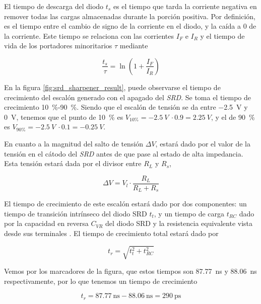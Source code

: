 El tiempo de descarga del diodo $t_s$ es el tiempo que tarda la corriente
negativa en remover todas las cargas almacenadas durante la porción positiva.
Por definición, es el tiempo entre el cambio de signo de la corriente en el
diodo, y la caída a $0$ de la corriente. Este tiempo se relaciona con las
corrientes $I_F$ e $I_R$ y el tiempo de vida de los portadores minoritarios
$\tau$ mediante \cite{an918}

\begin{equation}
    \frac{t_s}{\tau} = \ln \left( 1 + \frac{I_F}{I_R} \right)
\end{equation}

En la figura \ref{fig:srd_sharpener_result}, puede observarse el
tiempo de crecimiento del escalón generado con el apagado del \textit{SRD}. Se
toma el tiempo de crecimiento \qty{10}{\percent}-\qty{90}{\percent}. Siendo que
el escalón de tensión se da entre \qty{-2.5}{\volt} y \qty{0}{\volt}, tenemos
que el punto de \qty{10}{\percent} es $V_{10\%} = -2.5 \ V \ \cdot 0.9 =  2.25 \
V$, y el de \qty{90}{\percent} es $V_{90\%} = -2.5 \ V \ \cdot 0.1 =  -0.25 \
V$.

En cuanto a la magnitud del salto de tensión $\Delta V$, estará dado por el
valor de la tensión en el cátodo del \textit{SRD} antes de que pase al estado de
alta impedancia. Esta tensión estará dada por el divisor entre $R_L$ y $R_s$,

\begin{equation}
    \Delta V = V_l \cdot \frac{R_L}{R_L+R_s}
\end{equation}

El tiempo de crecimiento de este escalón estará dado por dos componentes: un
tiempo de transición intrínseco del diodo SRD $t_t$, y un tiempo de carga $t_{RC}$  dado por la
capacidad en reversa $C_{VR}$ del diodo SRD y la resistencia equivalente vista desde sus terminales \cite{an918}. El tiempo de crecimiento total estará dado por

\begin{equation}
    t_r = \sqrt{t_t^2+t_{RC}^2}
\end{equation}

Vemos por los marcadores de la figura, que estos tiempos son
\qty{87.77}{\nano\second} y \qty{88.06}{\nano\second} respectivamente, por lo
que tenemos un tiempo de crecimiento

\begin{equation}
    t_r = \qty{87.77}{\nano\second} - \qty{88.06}{\nano\second} =
    \qty{290}{\pico\second}
\end{equation}

